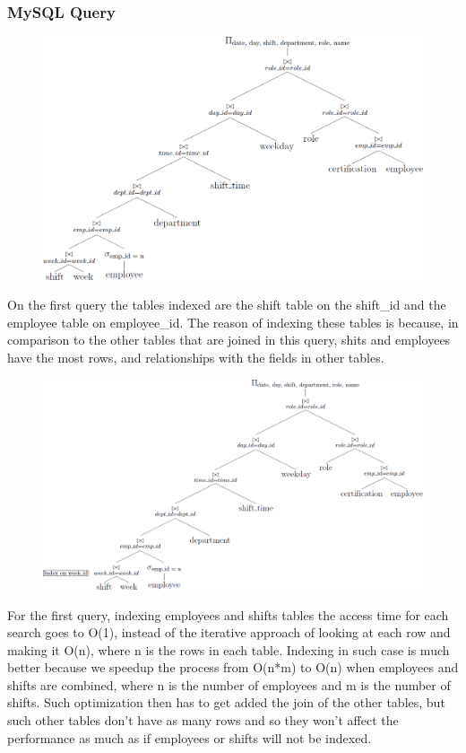 \documentclass[letter,12pt]{texMemo}
\begin{document}
\subsubsection*{MySQL Query}
	
\begin{figure}[H]
	\centering
	\includegraphics[width=\textwidth]{query1.png}
\end{figure}
On the first query the tables indexed are the shift table on the shift\_id and the employee table on employee\_id. The reason of indexing these tables is because, in comparison to the other tables that are joined in this query, shits and employees have the most rows, and relationships with the fields in other tables. 
\begin{figure}[H]
	\centering
	\includegraphics[width=\textwidth]{query1_indexed.png}
\end{figure}
For the first query, indexing employees and shifts tables the access time for each search goes to O(1), instead of the iterative approach of looking at each row and making it O(n), where n is the rows in each table. Indexing in such case is much better because we speedup the process from O(n*m) to O(n) when employees and shifts are combined, where n is the number of employees and m is the number of shifts. Such optimization then has to get added the join of the other tables, but such other tables don't have as many rows and so they won't affect the performance as much as if employees or shifts will not be indexed.
\vspace{1em}
\end{document}
